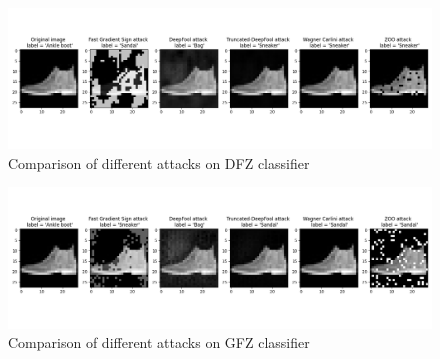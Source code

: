 \documentclass[10pt,twocolumn,letterpaper]{article}
\begin{document}
\begin{figure}[ht]
    \centering
    \includegraphics[width=\textwidth]{illustrations/attacks_sample_dfz.png}
    \caption{Comparison of different attacks on DFZ classifier}
    \label{fig:attacks_sample_dfz}
\end{figure}

\begin{figure}[ht]
    \centering
    \includegraphics[width=\textwidth]{illustrations/attacks_sample_gfz.png}
    \caption{Comparison of different attacks on GFZ classifier}
    \label{fig:attacks_sample_gfz}
\end{figure}
\end{document}
